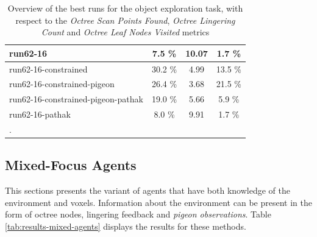 \begin{longtable}{|l|c|c|c|}
    run62-16	&	7.5	\%	&	10.07	&	1.7	\%	\\ \hline
    run62-16-constrained	&	30.2	\%	&	4.99	&	13.5	\%	\\ \hline
    run62-16-constrained-pigeon	&	26.4	\%	&	3.68	&	21.5	\%	\\ \hline
    run62-16-constrained-pigeon-pathak	&	19.0	\%	&	5.66	&	5.9	\%	\\ \hline
    run62-16-pathak	&	8.0	\%	&	9.91	&	1.7	\%	\\ \hline
    \caption{Overview of the best runs for the object exploration task, with respect to the \textit{Octree Scan Points Found}, \textit{Octree Lingering Count} and \textit{Octree Leaf Nodes Visited} metrics}. \label{tab:RQ2-results-comparative-voxeloctree}
\end{longtable}


\subsection{Mixed-Focus Agents}
This sections presents the variant of agents that have both knowledge of the environment and voxels. Information about the environment can be present in the form of octree nodes, lingering feedback and \textit{pigeon observations}. Table \ref{tab:results-mixed-agents} displays the results for these methods.

